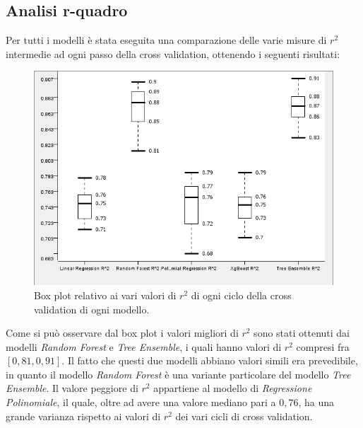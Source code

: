 \documentclass[12pt, a4paper, twocolumn]{article} %
\begin{document}
\subsection{Analisi r-quadro}
Per tutti i modelli è stata eseguita una comparazione delle varie misure di $r^{2}$ intermedie ad ogni passo della cross validation, ottenendo i seguenti risultati:
\begin{figure}[H]
  \includegraphics[scale=0.5]{./Immagini/boxplot-r2.png}
  \caption{Box plot relativo ai vari valori di $r^{2}$ di ogni ciclo della cross validation di ogni modello.}
\end{figure}
Come si può osservare dal box plot i valori migliori di $r^{2}$ sono stati ottenuti dai modelli \textit{Random Forest} e \textit{Tree Ensemble}, i quali hanno valori di $r^{2}$ compresi fra $[0,81, 0,91]$. Il fatto che questi due modelli abbiano valori simili era prevedibile, in quanto il modello \textit{Random Forest} è una variante particolare del modello \textit{Tree Ensemble}. Il valore peggiore di $r^{2}$ appartiene al modello di \textit{Regressione Polinomiale}, il quale, oltre ad avere una valore mediano pari a $0,76$, ha una grande varianza rispetto ai valori di $r^{2}$ dei vari cicli di cross validation. 
\end{document}
